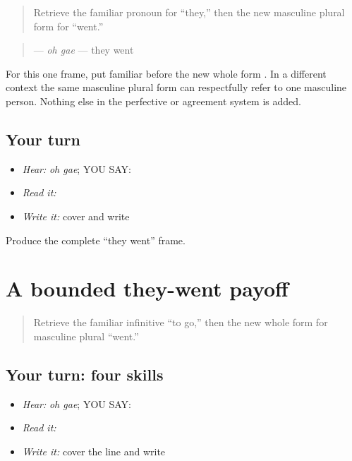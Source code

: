 \begin{quote}
Retrieve the familiar pronoun for “they,” then the new masculine plural form for “went.”
\end{quote}

\begin{grammarlens}[title={Grammar Lens}]
\begin{quote}
\textbf{ } — \emph{oh gae} — they went
\end{quote}

For this one frame, put familiar \textbf{} before the new whole form \textbf{}. In a different context the same masculine plural form can respectfully refer to one masculine person. Nothing else in the perfective or agreement system is added.
\end{grammarlens}

\subsection*{Your turn}
\begin{itemize}
\raggedright
  \item \emph{Hear:} \emph{oh gae}; YOU SAY: \textbf{ }
  \item \emph{Read it:} \textbf{ }
  \item \emph{Write it:} cover and write \textbf{ }
\end{itemize}

\begin{tcolorbox}[breakable,colback=teal!4,colframe=teal!35!black,title={Before you move on}]
Produce the complete “they went” frame.
\end{tcolorbox}
\section[\texorpdfstring{\pa{ਉਹ} \pa{ਗਏ} (oh gae)}{ਉਹ ਗਏ (oh gae)}]{A bounded they-went payoff}

\label{lesson:PA-C206-payoff}



\begin{quote}
Retrieve the familiar infinitive “to go,” then the new whole form for masculine plural “went.”
\end{quote}

\subsection*{Your turn: four skills}
\begin{itemize}
\raggedright
  \item \emph{Hear:} \emph{oh gae}; YOU SAY: \textbf{ }
  \item \emph{Read it:} \textbf{ }
  \item \emph{Write it:} cover the line and write \textbf{ }
\end{itemize}

